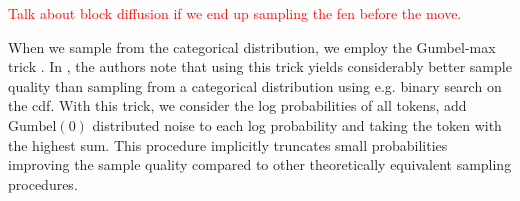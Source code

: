 \textcolor{red}{Talk about block diffusion if we end up sampling the fen before the move.}

\begin{algorithm}[H]
    \caption{Sampling for masked diffusion models}
    \label{alg:ancestral sampling}
\end{algorithm}

When we sample from the categorical distribution, we employ the Gumbel-max trick \cite{kool2019stochasticbeamsandwheretofindthem}. In \cite{shi2025simplifiedgeneralizedmaskeddiffusion}, the authors note that using this trick yields considerably better sample quality than sampling from a categorical distribution using e.g. binary search on the cdf. With this trick, we consider the log probabilities of all tokens, add $\mathrm{Gumbel}(0)$ distributed noise to each log probability and taking the token with the highest sum. This procedure implicitly truncates small probabilities improving the sample quality compared to other theoretically equivalent sampling procedures. 
